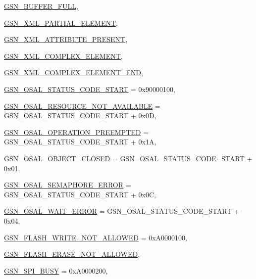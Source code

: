 \begin{DoxyCompactItemize}
\par
\hyperlink{a00659_gga476ae1caf992f8287176b2cc414c8707a7c75a1442d986e545085ed00ad16af0e}{GSN\_\-BUFFER\_\-FULL}, 
\par
\hyperlink{a00659_gga476ae1caf992f8287176b2cc414c8707a01ca11b8e39bf12989020ac800aeed79}{GSN\_\-XML\_\-PARTIAL\_\-ELEMENT}, 
\par
\hyperlink{a00659_gga476ae1caf992f8287176b2cc414c8707a73f0a3dccf9843f14a74761932fd6932}{GSN\_\-XML\_\-ATTRIBUTE\_\-PRESENT}, 
\par
\hyperlink{a00659_gga476ae1caf992f8287176b2cc414c8707a67b0a2de82e6b35ba5177aecd7a2f9fb}{GSN\_\-XML\_\-COMPLEX\_\-ELEMENT}, 
\par
\hyperlink{a00659_gga476ae1caf992f8287176b2cc414c8707a03fb9d27f1ba83873fd20c3248c1da65}{GSN\_\-XML\_\-COMPLEX\_\-ELEMENT\_\-END}, 
\par
\hyperlink{a00659_gga476ae1caf992f8287176b2cc414c8707a77edf0492ca255a3ab7158e082d5cac9}{GSN\_\-OSAL\_\-STATUS\_\-CODE\_\-START} =  0x90000100, 
\par
\hyperlink{a00659_gga476ae1caf992f8287176b2cc414c8707abf5c8b05a529fac33b93e5716054d2e3}{GSN\_\-OSAL\_\-RESOURCE\_\-NOT\_\-AVAILABLE} =  GSN\_\-OSAL\_\-STATUS\_\-CODE\_\-START + 0x0D, 
\par
\hyperlink{a00659_gga476ae1caf992f8287176b2cc414c8707a2f265a93e157558b25a4247a22b9eb45}{GSN\_\-OSAL\_\-OPERATION\_\-PREEMPTED} =  GSN\_\-OSAL\_\-STATUS\_\-CODE\_\-START + 0x1A, 
\par
\hyperlink{a00659_gga476ae1caf992f8287176b2cc414c8707a8c382363ca44bf1579bc072a6b16ea69}{GSN\_\-OSAL\_\-OBJECT\_\-CLOSED} =  GSN\_\-OSAL\_\-STATUS\_\-CODE\_\-START + 0x01, 
\par
\hyperlink{a00659_gga476ae1caf992f8287176b2cc414c8707a0172fcec91604abac7da9a4da9acb827}{GSN\_\-OSAL\_\-SEMAPHORE\_\-ERROR} =  GSN\_\-OSAL\_\-STATUS\_\-CODE\_\-START + 0x0C, 
\par
\hyperlink{a00659_gga476ae1caf992f8287176b2cc414c8707a4372275b7acc4c09a807c107819a87c0}{GSN\_\-OSAL\_\-WAIT\_\-ERROR} =  GSN\_\-OSAL\_\-STATUS\_\-CODE\_\-START + 0x04, 
\par
\hyperlink{a00659_gga476ae1caf992f8287176b2cc414c8707a1b812b67c4e93506fb34b25d01fa3a7d}{GSN\_\-FLASH\_\-WRITE\_\-NOT\_\-ALLOWED} =  0xA0000100, 
\par
\hyperlink{a00659_gga476ae1caf992f8287176b2cc414c8707a71daf09c6c80f9f705611efd5ab8decd}{GSN\_\-FLASH\_\-ERASE\_\-NOT\_\-ALLOWED}, 
\par
\hyperlink{a00659_gga476ae1caf992f8287176b2cc414c8707ab38cfabb3bb4d30421e9116b1e6c0b6d}{GSN\_\-SPI\_\-BUSY} =  0xA0000200, 

\end{DoxyCompactItemize}
